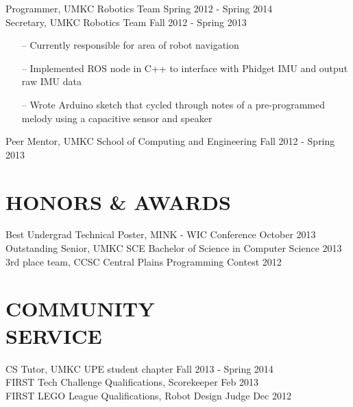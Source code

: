 \documentclass[line,margin]{res}
\begin{document}
\begin{resume}
		
		Programmer, UMKC Robotics Team \hfill Spring 2012 - Spring 2014\\ 
		Secretary, UMKC Robotics Team \hfill  Fall 2012 - Spring 2013 	
		\begin{itemize} [leftmargin=5mm]  \itemsep -2pt %
                 \item[--] Currently responsible for area of robot navigation 
                 \item[--] Implemented ROS node in C++ to interface with Phidget IMU and output raw IMU data
                 \item[--] Wrote Arduino sketch that cycled through notes of a pre-programmed melody using a capacitive sensor and speaker
                 \end{itemize} 


		Peer Mentor, UMKC School of Computing and Engineering \hfill Fall 2012 - Spring 2013 

\section{HONORS \& AWARDS}
		Best Undergrad Technical Poster, MINK - WIC Conference \hfill October 2013	\\
		Outstanding Senior, UMKC SCE Bachelor of Science in Computer Science \hfill 2013 \\
		3rd place team, CCSC Central Plains Programming Contest \hfill 2012 
\section{COMMUNITY \\ SERVICE}  
            	CS Tutor, UMKC UPE student chapter  \hfill Fall 2013 - Spring 2014\\
                FIRST Tech Challenge Qualifications, Scorekeeper \hfill Feb 2013 \\
		FIRST LEGO League Qualifications, Robot Design Judge \hfill Dec 2012  \\
\end{resume}
\end{document}
